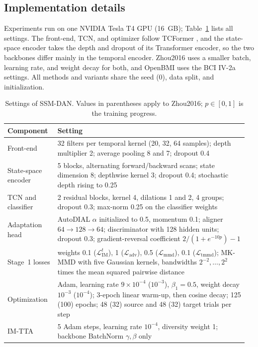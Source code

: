 \documentclass[preprint,12pt]{elsarticle}
\begin{document}
\subsection{Implementation details}
\label{subsec:training}

Experiments run on one NVIDIA Tesla T4 GPU (16~GB); Table~\ref{tab:hyperparams} lists all settings. The front-end, TCN, and optimizer follow TCFormer \cite{altaheri2025tcformer}, and the state-space encoder takes the depth and dropout of its Transformer encoder, so the two backbones differ mainly in the temporal encoder. Zhou2016 uses a smaller batch, learning rate, and weight decay for both, and OpenBMI uses the BCI IV-2a settings. All methods and variants share the seed (0), data split, and initialization.

\begin{table}[!htbp]
\centering
\caption{Settings of SSM-DAN. Values in parentheses apply to Zhou2016; $p\in[0,1]$ is the training progress.}
\label{tab:hyperparams}
\small
\begin{tabular}{@{}p{0.2\linewidth}p{0.76\linewidth}@{}}
\toprule
Component & Setting \\
\midrule
Front-end & 32 filters per temporal kernel (20, 32, 64 samples); depth multiplier 2; average pooling 8 and 7; dropout 0.4 \\
State-space encoder & 5 blocks, alternating forward/backward scans; state dimension 8; depthwise kernel 3; dropout 0.4; stochastic depth rising to 0.25 \\
TCN and classifier & 2 residual blocks, kernel 4, dilations 1 and 2, 4 groups; dropout 0.3; max-norm 0.25 on the classifier weights \\
Adaptation head & AutoDIAL $\alpha$ initialized to 0.5, momentum 0.1; aligner $64\!\rightarrow\!128\!\rightarrow\!64$; discriminator with 128 hidden units; dropout 0.3; gradient-reversal coefficient $2/(1+e^{-10p})-1$ \cite{ganin2016dann} \\
Stage~1 losses & weights 0.1 ($\mathcal{L}_\mathrm{IM}^{t}$), 1 ($\mathcal{L}_\mathrm{adv}$), 0.5 ($\mathcal{L}_\mathrm{mmd}$), 0.1 ($\mathcal{L}_\mathrm{tmmd}$); MK-MMD with five Gaussian kernels, bandwidths $2^{-2},\dots,2^{2}$ times the mean squared pairwise distance \\
Optimization & Adam, learning rate $9\times10^{-4}$ ($10^{-3}$), $\beta_1=0.5$, weight decay $10^{-3}$ ($10^{-4}$); 3-epoch linear warm-up, then cosine decay; 125 (100) epochs; 48 (32) source and 48 (32) target trials per step \\
IM-TTA & 5 Adam steps, learning rate $10^{-4}$, diversity weight 1; backbone BatchNorm $\gamma,\beta$ only \\
\bottomrule
\end{tabular}
\end{table}
\end{document}
